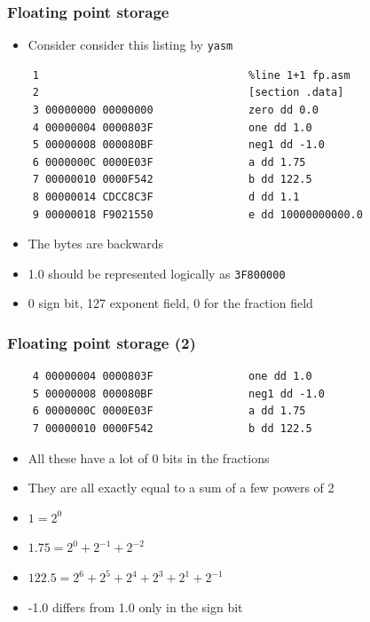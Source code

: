 \documentclass{beamer}
\begin{document}
\begin{frame}[fragile]
    \frametitle{Floating point storage}
    \begin{itemize}
        \item Consider consider this listing by {\tt yasm}
    \end{itemize}

    \begin{verbatim}
    1                                 %line 1+1 fp.asm
    2                                 [section .data]
    3 00000000 00000000               zero dd 0.0
    4 00000004 0000803F               one dd 1.0
    5 00000008 000080BF               neg1 dd -1.0
    6 0000000C 0000E03F               a dd 1.75
    7 00000010 0000F542               b dd 122.5
    8 00000014 CDCC8C3F               d dd 1.1
    9 00000018 F9021550               e dd 10000000000.0
    \end{verbatim}
    \begin{itemize}
        \item The bytes are backwards
        \item 1.0 should be represented logically as {\tt 3F800000}
        \item 0 sign bit, 127 exponent field, 0 for the fraction field
    \end{itemize}
\end{frame}

\begin{frame}[fragile]
    \frametitle{Floating point storage (2)}
    \begin{verbatim}
    4 00000004 0000803F               one dd 1.0
    5 00000008 000080BF               neg1 dd -1.0
    6 0000000C 0000E03F               a dd 1.75
    7 00000010 0000F542               b dd 122.5
    \end{verbatim}
    \begin{itemize}
        \item All these have a lot of 0 bits in the fractions
        \item They are all exactly equal to a sum of a few powers of 2
        \item $1 = 2^0$
        \item $1.75 = 2^0 + 2^{-1} + 2^{-2}$
        \item $122.5 = 2^6+2^5+2^4+2^3+2^1+2^{-1}$
        \item -1.0 differs from 1.0 only in the sign bit
    \end{itemize}
\end{frame}
\end{document}
